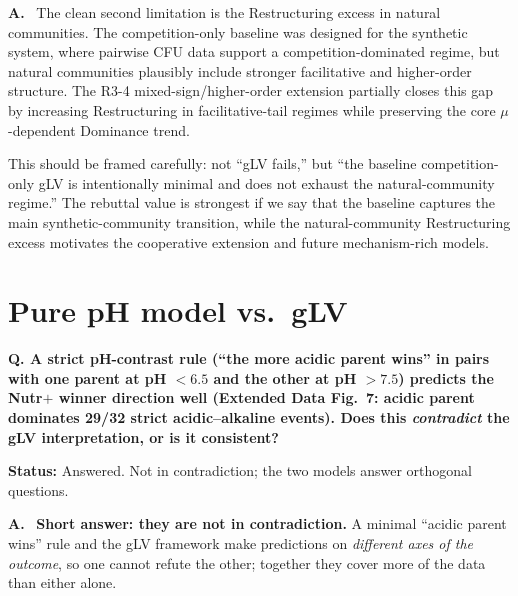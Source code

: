 \documentclass[11pt]{article}
\newcommand{\question}[1]{%
    \par\vspace{0.4em}\noindent%
    {\color{blue!70!black}\textbf{Q. #1}}\par\smallskip%
}
\newcommand{\answerlabel}{\par\noindent\textbf{A.}\ }
\newcommand{\statusmark}[1]{{\color{red!70!black}\textbf{Status:} #1}\par}
\begin{document}
\answerlabel
The clean second limitation is the Restructuring excess in natural communities. The competition-only baseline was designed for the synthetic system, where pairwise CFU data support a competition-dominated regime, but natural communities plausibly include stronger facilitative and higher-order structure. The R3-4 mixed-sign/higher-order extension partially closes this gap by increasing Restructuring in facilitative-tail regimes while preserving the core $\mu$-dependent Dominance trend.

This should be framed carefully: not ``gLV fails,'' but ``the baseline competition-only gLV is intentionally minimal and does not exhaust the natural-community regime.'' The rebuttal value is strongest if we say that the baseline captures the main synthetic-community transition, while the natural-community Restructuring excess motivates the cooperative extension and future mechanism-rich models.

\section{Pure pH model vs.\ gLV}
\label{sec:q3_pH_vs_gLV}

\question{A strict pH-contrast rule (``the more acidic parent wins'' in pairs with one parent at pH $<6.5$ and the other at pH $>7.5$) predicts the Nutr$+$ winner direction well (Extended Data Fig.~7: acidic parent dominates 29/32 strict acidic--alkaline events). Does this \emph{contradict} the gLV interpretation, or is it consistent?}
\statusmark{Answered. Not in contradiction; the two models answer orthogonal questions.}

\answerlabel
\textbf{Short answer: they are not in contradiction.} A minimal ``acidic parent wins'' rule and the gLV framework make predictions on \emph{different axes of the outcome}, so one cannot refute the other; together they cover more of the data than either alone.
\end{document}
